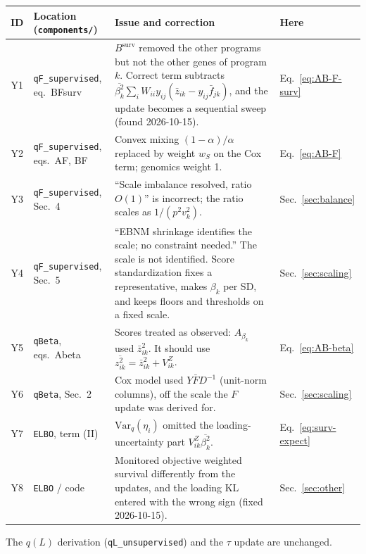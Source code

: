 \documentclass[11pt]{article}
\newcommand{\fbar}[2]{\bar{f}_{#1#2}}
\newcommand{\zbar}[2]{\bar{z}_{#1#2}}
\newcommand{\zsec}[2]{\overline{z^2_{#1#2}}}
\newcommand{\betasec}[1]{\overline{\beta^2_{#1}}}
\newcommand{\Var}{\mathrm{Var}_q}
\newcommand{\ws}{w_S}
\begin{document}
\begin{center}
\begin{tabularx}{\textwidth}{c>{\raggedright\arraybackslash}p{3.4cm}>{\raggedright\arraybackslash}X>{\raggedright\arraybackslash}p{2.4cm}}
\toprule
ID & Location (\texttt{components/}) & Issue and correction & Here \\
\midrule
Y1 & \texttt{qF\_supervised}, eq.\ BFsurv & $B^{\text{surv}}$ removed the other programs but not the other genes of program $k$. Correct term subtracts $\betasec{k}\sum_i W_{ii}y_{ij}(\zbar{i}{k}-y_{ij}\fbar{j}{k})$, and the update becomes a sequential sweep (found 2026-10-15). & Eq.~\eqref{eq:AB-F-surv} \\
Y2 & \texttt{qF\_supervised}, eqs.\ AF, BF & Convex mixing $(1-\alpha)/\alpha$ replaced by weight $\ws$ on the Cox term; genomics weight 1. & Eq.~\eqref{eq:AB-F} \\
Y3 & \texttt{qF\_supervised}, Sec.\ 4 & ``Scale imbalance resolved, ratio $O(1)$'' is incorrect; the ratio scales as $1/(p^2v_k^2)$. & Sec.~\ref{sec:balance} \\
Y4 & \texttt{qF\_supervised}, Sec.\ 5 & ``EBNM shrinkage identifies the scale; no constraint needed.'' The scale is not identified. Score standardization fixes a representative, makes $\beta_k$ per SD, and keeps floors and thresholds on a fixed scale. & Sec.~\ref{sec:scaling} \\
Y5 & \texttt{qBeta}, eqs.\ Abeta & Scores treated as observed: $A_{\beta_k}$ used $\zbar{i}{k}^2$. It should use $\zsec{i}{k} = \zbar{i}{k}^2 + V^Z_{ik}$. & Eq.~\eqref{eq:AB-beta} \\
Y6 & \texttt{qBeta}, Sec.\ 2 & Cox model used $Y\bar F D^{-1}$ (unit-norm columns), off the scale the $F$ update was derived for. & Sec.~\ref{sec:scaling} \\
Y7 & \texttt{ELBO}, term (II) & $\Var(\eta_i)$ omitted the loading-uncertainty part $V^Z_{ik}\betasec{k}$. & Eq.~\eqref{eq:surv-expect} \\
Y8 & \texttt{ELBO} / code & Monitored objective weighted survival differently from the updates, and the loading KL entered with the wrong sign (fixed 2026-10-15). & Sec.~\ref{sec:other} \\
\bottomrule
\end{tabularx}
\end{center}

The $q(L)$ derivation (\texttt{qL\_unsupervised}) and the $\tau$ update are
unchanged.

\appendix
\end{document}
